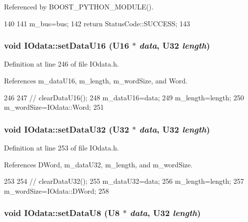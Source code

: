 Referenced by BOOST\_\-PYTHON\_\-MODULE().


\begin{DoxyCode}
140                                   {
141     m_bus=bus;
142     return StatusCode::SUCCESS;
143   }
\end{DoxyCode}
\hypertarget{classIOdata_a1796a65cbd8c4326e80d662034ee5e39}{
\subsubsection[{setDataU16}]{\setlength{\rightskip}{0pt plus 5cm}void IOdata::setDataU16 ({\bf U16} $\ast$ {\em data}, \/  {\bf U32} {\em length})}}
\label{classIOdata_a1796a65cbd8c4326e80d662034ee5e39}


Definition at line 246 of file IOdata.h.

References m\_\-dataU16, m\_\-length, m\_\-wordSize, and Word.


\begin{DoxyCode}
246                                         {
247 //    clearDataU16();
248     m_dataU16=data;
249     m_length=length;
250     m_wordSize=IOdata::Word;
251   }
\end{DoxyCode}
\hypertarget{classIOdata_a408b62ac645630c645ae670691f6459f}{
\subsubsection[{setDataU32}]{\setlength{\rightskip}{0pt plus 5cm}void IOdata::setDataU32 ({\bf U32} $\ast$ {\em data}, \/  {\bf U32} {\em length})}}
\label{classIOdata_a408b62ac645630c645ae670691f6459f}


Definition at line 253 of file IOdata.h.

References DWord, m\_\-dataU32, m\_\-length, and m\_\-wordSize.


\begin{DoxyCode}
253                                         {
254 //    clearDataU32();
255     m_dataU32=data;
256     m_length=length;
257     m_wordSize=IOdata::DWord;
258   }
\end{DoxyCode}
\hypertarget{classIOdata_afece89b7035f6eec001cd397f07c062d}{
\subsubsection[{setDataU8}]{\setlength{\rightskip}{0pt plus 5cm}void IOdata::setDataU8 ({\bf U8} $\ast$ {\em data}, \/  {\bf U32} {\em length})}}
\label{classIOdata_afece89b7035f6eec001cd397f07c062d}


